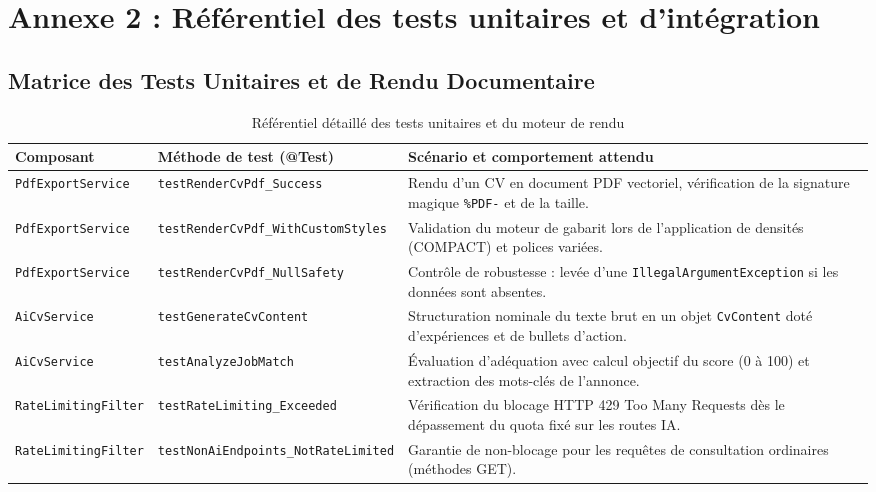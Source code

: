 \documentclass[11pt,a4paper]{article}
\begin{document}
\section{Annexe 2 : Référentiel des tests unitaires et d'intégration}

\subsection{Matrice des Tests Unitaires et de Rendu Documentaire}

\begin{table}[h!]
\centering
\small
\renewcommand{\arraystretch}{1.2}
\begin{tabularx}{\textwidth}{|l|l|X|}
\hline
\rowcolor{headergray}
\textbf{Composant} & \textbf{Méthode de test (@Test)} & \textbf{Scénario et comportement attendu} \\
\hline
\texttt{PdfExportService} & \texttt{testRenderCvPdf\_Success} & Rendu d'un CV en document PDF vectoriel, vérification de la signature magique \texttt{\%PDF-} et de la taille. \\
\hline
\texttt{PdfExportService} & \texttt{testRenderCvPdf\_WithCustomStyles} & Validation du moteur de gabarit lors de l'application de densités (COMPACT) et polices variées. \\
\hline
\texttt{PdfExportService} & \texttt{testRenderCvPdf\_NullSafety} & Contrôle de robustesse : levée d'une \texttt{IllegalArgumentException} si les données sont absentes. \\
\hline
\texttt{AiCvService} & \texttt{testGenerateCvContent} & Structuration nominale du texte brut en un objet \texttt{CvContent} doté d'expériences et de bullets d'action. \\
\hline
\texttt{AiCvService} & \texttt{testAnalyzeJobMatch} & Évaluation d'adéquation avec calcul objectif du score (0 à 100) et extraction des mots-clés de l'annonce. \\
\hline
\texttt{RateLimitingFilter} & \texttt{testRateLimiting\_Exceeded} & Vérification du blocage HTTP 429 Too Many Requests dès le dépassement du quota fixé sur les routes IA. \\
\hline
\texttt{RateLimitingFilter} & \texttt{testNonAiEndpoints\_NotRateLimited} & Garantie de non-blocage pour les requêtes de consultation ordinaires (méthodes GET). \\
\hline
\end{tabularx}
\caption{Référentiel détaillé des tests unitaires et du moteur de rendu}
\end{table}
\end{document}
